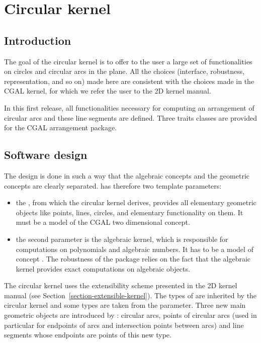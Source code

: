 \chapter{Circular kernel}
\label{chapter-circular-kernel}


\section{Introduction}

The goal of the circular kernel is to offer to the user a large set of
functionalities on circles and circular arcs in the plane. All the
choices (interface, robustness, representation, and so on) made here
are consistent with the choices made in the CGAL kernel, for which we
refer the user to the 2D kernel manual. 

In this first release, all functionalities necessary for computing an
arrangement of circular arcs and these line segments are
defined. Three traits classes are provided for the CGAL arrangement
package. 

\section{Software design}

The design is done in such a way that the algebraic concepts and the
geometric concepts are clearly separated. 
has therefore two template parameters: 
\begin{itemize}
\item {} the , from which the circular kernel derives,
provides all elementary geometric objects like points, lines, circles, and
elementary functionality on them. It must be a model of the CGAL two 
dimensional  concept.
\item {} the second parameter is the algebraic kernel, which is 
responsible for computations on polynomials and algebraic numbers. It 
has to be a model of concept . The
robustness of the package relies on the fact that the algebraic kernel
provides exact computations on algebraic objects.
\end{itemize}

The circular kernel uses the extensibility scheme presented in the 2D
kernel manual (see Section~\ref{section-extensible-kernel}). 
The types of  are inherited
by the circular kernel and some types are taken from the
 parameter. Three new main geometric objects are
introduced by : circular arcs, points of
circular arcs (used in particular for endpoints of arcs and
intersection points between arcs) and line segments whose endpoints
are points of this new type.  

